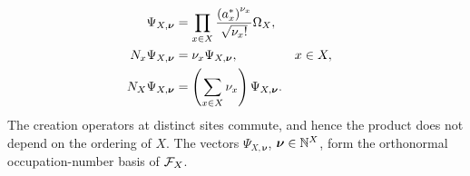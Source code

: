 \documentclass[11pt,a4paper]{article}
\theoremstyle{plain}
\theoremstyle{definition}
\theoremstyle{remark}
\begin{document}
\begin{equation}
\begin{aligned}
\Psi_{X,\boldsymbol{\nu}}
& =
\prod_{x \in X}
\frac{\rbk{\faadj{a_x}}^{\nu_x}}{\sqrt{\nu_x!}}
\Omega_X,
\\
N_x\Psi_{X,\boldsymbol{\nu}}
& =
\nu_x\Psi_{X,\boldsymbol{\nu}},
&
x
& \in
X,
\\
\opfocknumber_X\Psi_{X,\boldsymbol{\nu}}
& =
\rbk{\sum_{x \in X}\nu_x}\Psi_{X,\boldsymbol{\nu}}.
\end{aligned}
\label{eq:fock-occupation-number-basis}
\end{equation} The creation operators at distinct sites commute, and hence the product does not depend on the ordering of \(X\). The vectors \(\Psi_{X,\boldsymbol{\nu}}\), \(\boldsymbol{\nu} \in \mathbb{N}^X\), form the orthonormal occupation-number basis of \(\sphilb{F}_X\).
\end{document}
